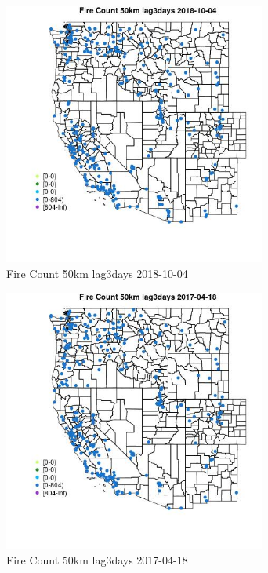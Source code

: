 \begin{figure} 
\centering  
\includegraphics[width=0.77\textwidth]{Code_Outputs/Report_ML_input_PM25_Step4_part_f_de_duplicated_aveswNAs_MapObsFire_Count_50km_lag3days2018-10-04.jpg} 
\caption{\label{fig:Report_ML_input_PM25_Step4_part_f_de_duplicated_aveswNAsMapObsFire_Count_50km_lag3days2018-10-04}Fire Count 50km lag3days 2018-10-04} 
\end{figure} 
 

\clearpage 

\begin{figure} 
\centering  
\includegraphics[width=0.77\textwidth]{Code_Outputs/Report_ML_input_PM25_Step4_part_f_de_duplicated_aveswNAs_MapObsFire_Count_50km_lag3days2017-04-18.jpg} 
\caption{\label{fig:Report_ML_input_PM25_Step4_part_f_de_duplicated_aveswNAsMapObsFire_Count_50km_lag3days2017-04-18}Fire Count 50km lag3days 2017-04-18} 
\end{figure} 
 

